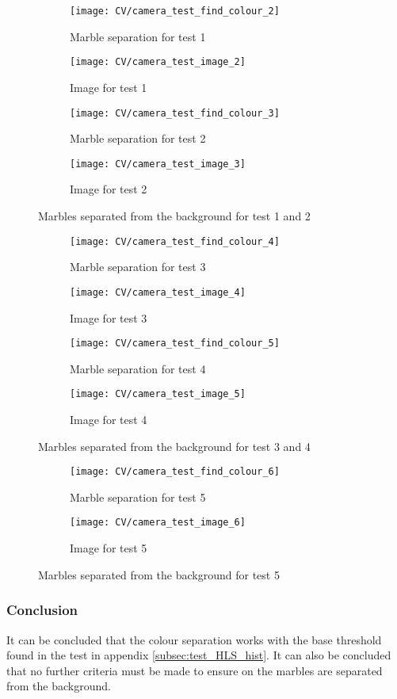 \documentclass[../Head/Main.tex]{subfiles}
\begin{document}
\begin{figure}[H]
	\centering
	\begin{subfigure}[b]{0.245\textwidth}
		\centering
		\texttt{[image: CV/camera\_test\_find\_colour\_2]}
		\caption{Marble separation for test 1}
	\end{subfigure}
	\hfill
	\begin{subfigure}[b]{0.245\textwidth}
		\centering
		\texttt{[image: CV/camera\_test\_image\_2]}
		\caption{Image for test 1}
	\end{subfigure}
	\hfill 
	\begin{subfigure}[b]{0.245\textwidth}
		\centering
		\texttt{[image: CV/camera\_test\_find\_colour\_3]}
		\caption{Marble separation for test 2}
	\end{subfigure}
	\hfill
	\begin{subfigure}[b]{0.245\textwidth}
		\centering
		\texttt{[image: CV/camera\_test\_image\_3]}
		\caption{Image for test 2}
	\end{subfigure}
	\caption{Marbles separated from the background for test 1 and 2}
\end{figure}

\begin{figure}[H]
	\centering
	\begin{subfigure}[b]{0.245\textwidth}
		\centering
		\texttt{[image: CV/camera\_test\_find\_colour\_4]}
		\caption{Marble separation for test 3}
	\end{subfigure}
	\hfill
	\begin{subfigure}[b]{0.245\textwidth}
		\centering
		\texttt{[image: CV/camera\_test\_image\_4]}
		\caption{Image for test 3}
	\end{subfigure}
	\hfill 
	\begin{subfigure}[b]{0.245\textwidth}
		\centering
		\texttt{[image: CV/camera\_test\_find\_colour\_5]}
		\caption{Marble separation for test 4}
	\end{subfigure}
	\hfill
	\begin{subfigure}[b]{0.245\textwidth}
		\centering
		\texttt{[image: CV/camera\_test\_image\_5]}
		\caption{Image for test 4}
	\end{subfigure}
	\caption{Marbles separated from the background for test 3 and 4}
\end{figure}

\begin{figure}[H]
	\centering
	\begin{subfigure}[b]{0.49\textwidth}
		\centering
		\texttt{[image: CV/camera\_test\_find\_colour\_6]}
		\caption{Marble separation for test 5}
	\end{subfigure}
	\hfill
	\begin{subfigure}[b]{0.49\textwidth}
		\centering
		\texttt{[image: CV/camera\_test\_image\_6]}
		\caption{Image for test 5}
	\end{subfigure}
	\caption{Marbles separated from the background for test 5}
\end{figure}

\subsubsection{Conclusion}
It can be concluded that the colour separation works with the base threshold found in the test in appendix \ref{subsec:test_HLS_hist}. It can also be concluded that no further criteria must be made to ensure on the marbles are separated from the background.
\end{document}
